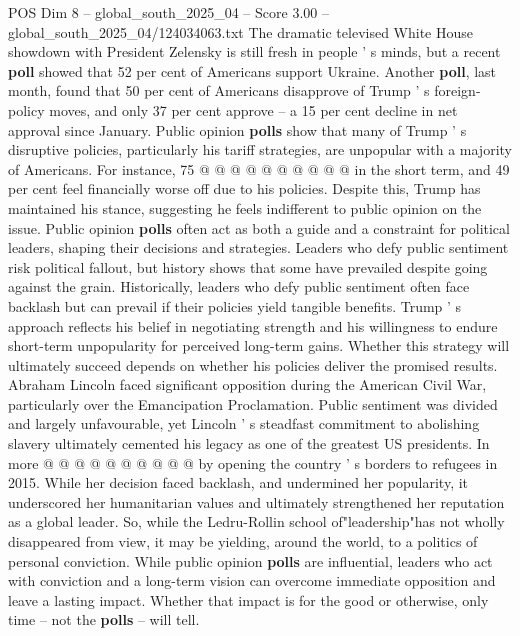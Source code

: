 \begin{textsample}{POS Dim 8 – global\_south\_2025\_04 – Score 3.00 – global\_south\_2025\_04/124034063.txt}
The dramatic televised White House showdown with President Zelensky is still fresh in people ' s minds, but a recent \textbf{poll} showed that 52 per cent of Americans support Ukraine.
Another \textbf{poll}, last month, found that 50 per cent of Americans disapprove of Trump ' s foreign-policy moves, and only 37 per cent approve -- a 15 per cent decline in net approval since January.
Public opinion \textbf{polls} show that many of Trump ' s disruptive policies, particularly his tariff strategies, are unpopular with a majority of Americans.
For instance, 75 @ @ @ @ @ @ @ @ @ @ in the short term, and 49 per cent feel financially worse off due to his policies.
Despite this, Trump has maintained his stance, suggesting he feels indifferent to public opinion on the issue.
Public opinion \textbf{polls} often act as both a guide and a constraint for political leaders, shaping their decisions and strategies.
Leaders who defy public sentiment risk political fallout, but history shows that some have prevailed despite going against the grain.
Historically, leaders who defy public sentiment often face backlash but can prevail if their policies yield tangible benefits.
Trump ' s approach reflects his belief in negotiating strength and his willingness to endure short-term unpopularity for perceived long-term gains.
Whether this strategy will ultimately succeed depends on whether his policies deliver the promised results.
Abraham Lincoln faced significant opposition during the American Civil War, particularly over the Emancipation Proclamation.
Public sentiment was divided and largely unfavourable, yet Lincoln ' s steadfast commitment to abolishing slavery ultimately cemented his legacy as one of the greatest US presidents.
In more @ @ @ @ @ @ @ @ @ @ by opening the country ' s borders to refugees in 2015.
While her decision faced backlash, and undermined her popularity, it underscored her humanitarian values and ultimately strengthened her reputation as a global leader.
So, while the Ledru-Rollin school of"leadership"has not wholly disappeared from view, it may be yielding, around the world, to a politics of personal conviction.
While public opinion \textbf{polls} are influential, leaders who act with conviction and a long-term vision can overcome immediate opposition and leave a lasting impact.
Whether that impact is for the good or otherwise, only time -- not the \textbf{polls} -- will tell.

\end{textsample}
